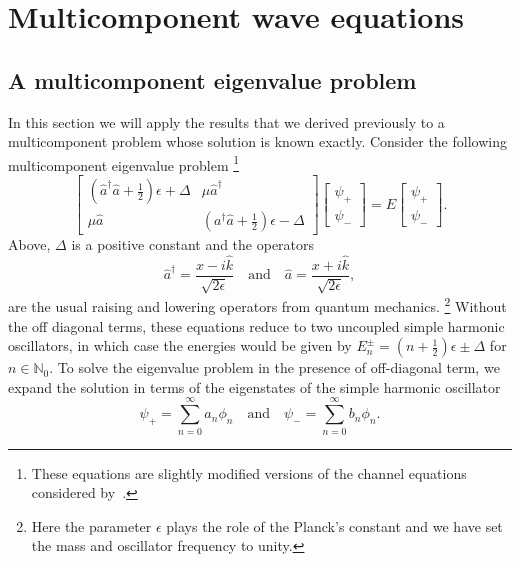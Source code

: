 \section{Multicomponent wave equations}

\subsection{A multicomponent eigenvalue problem}

In this section we will apply the results that we derived previously to a multicomponent problem whose solution is known exactly.
Consider the following multicomponent eigenvalue problem%
\footnote{These equations are slightly modified versions of the channel equations considered by~\citet{yabana1986}.}
%
\begin{equation}
  \begin{bmatrix}
    \left(\hat{a}^{\dagger}\hat{a} + \frac{1}{2}\right)\epsilon + \Delta & \mu\hat{a}^{\dagger}\\
    \mu\hat{a} & \left(a^{\dagger}\hat{a} + \frac{1}{2}\right)\epsilon - \Delta
  \end{bmatrix}
  \begin{bmatrix}
    \psi_{+}\\
    \psi_{-}
  \end{bmatrix}
  =
  E
  \begin{bmatrix}
    \psi_{+}\\
    \psi_{-}
  \end{bmatrix}.
\end{equation}
%
Above, $\Delta$ is a positive constant and the operators
%
\begin{equation}
\hat{a}^{\dagger} = \frac{x - i\hat{k}}{\sqrt{2\epsilon}}
  \quad\text{and}\quad
\hat{a} = \frac{x + i\hat{k}}{\sqrt{2\epsilon}},
\end{equation}
%
are the usual raising and lowering operators from quantum mechanics.%
\footnote{Here the parameter $\epsilon$ plays the role of the Planck's constant and we have set the mass and oscillator frequency to unity.}
Without the off diagonal terms, these equations reduce to two uncoupled simple harmonic oscillators, in which case the energies would be given by $E_{n}^{\pm} = (n + \frac{1}{2})\epsilon \pm \Delta$ for $n \in \mathbb{N}_{0}$.
To solve the eigenvalue problem in the presence of off-diagonal term, we expand the solution in terms of the eigenstates of the simple harmonic oscillator
%
\begin{equation}
  \psi_{+} = \sum_{n= 0}^{\infty} a_{n}\phi_{n}
  \quad\text{and}\quad
  \psi_{-} = \sum_{n = 0}^{\infty} b_{n}\phi_{n}.
\end{equation}
